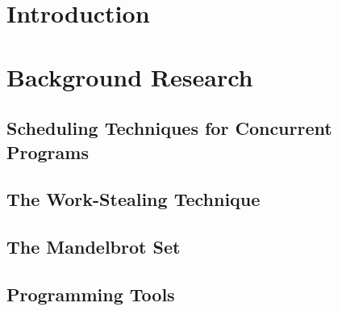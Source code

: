 \chapter{Introduction}

\chapter{Background Research}
\section{Scheduling Techniques for Concurrent Programs}

\section{The Work-Stealing Technique}

\section{The Mandelbrot Set}

\section{Programming Tools}

